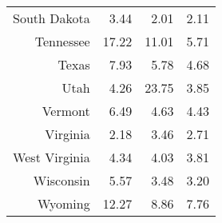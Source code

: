 \begin{table}[ht]
\begin{tabular}{rrrr}
  South Dakota & 3.44 & 2.01 & 2.11 \\ 
  Tennessee & 17.22 & 11.01 & 5.71 \\ 
  Texas & 7.93 & 5.78 & 4.68 \\ 
  Utah & 4.26 & 23.75 & 3.85 \\ 
  Vermont & 6.49 & 4.63 & 4.43 \\ 
  Virginia & 2.18 & 3.46 & 2.71 \\ 
  West Virginia & 4.34 & 4.03 & 3.81 \\ 
  Wisconsin & 5.57 & 3.48 & 3.20 \\ 
  Wyoming & 12.27 & 8.86 & 7.76 \\ 
   \hline
\end{tabular}
\end{table}
